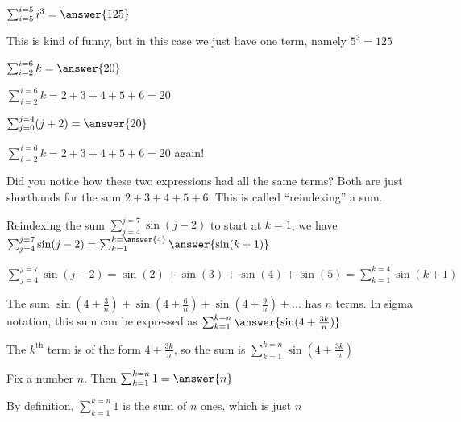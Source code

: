 \documentclass{ximera}
\begin{document}
\begin{question}
	$\sum_{i=5}^{i=5} i^3 = \answer{125}$
	\begin{hint}
		This is kind of funny, but in this case we just have one term, namely $5^3 = 125$
	\end{hint}
\end{question}

\begin{question}

	$\sum_{i=2}^{i=6} k = \answer{20}$

	 \begin{hint}
	 	$\sum_{i=2}^{i=6} k = 2+3+4+5+6 = 20$
	 \end{hint}
	
	$\sum_{j=0}^{j=4} (j+2) = \answer{20}$
	 \begin{hint}
	 	$\sum_{i=2}^{i=6} k = 2+3+4+5+6 = 20$ again!
	 \end{hint}
	
	\begin{feedback}
Did you notice how these two expressions had all the same terms?  Both are just shorthands for the sum $2+3+4+5+6$.  This is called ``reindexing'' a sum.
	\end{feedback}
\end{question}

\begin{question}
	Reindexing the sum $\sum_{j=4}^{j=7} \sin(j-2)$ to start at $k=1$, we have $\sum_{j=4}^{j=7} \sin(j-2) = \sum_{k=1}^{k=\answer{4}} \answer{\sin(k+1)}$
		\begin{hint}
			$\sum_{j=4}^{j=7} \sin(j-2) = \sin(2)+\sin(3) + \sin(4)+\sin(5) = \sum_{k=1}^{k=4} \sin(k+1)$
		\end{hint}
\end{question}

\begin{question}
	The sum $\sin(4+\frac{3}{n}) + \sin(4+\frac{6}{n})+\sin(4+\frac{9}{n})+...$ has $n$ terms. In sigma notation, this sum can be expressed as $\sum_{k=1}^{k=n} \answer{ \sin(4+\frac{3k}{n})}$
		\begin{hint}
			The $k^{\textrm{th}}$ term is of the form $4+\frac{3k}{n}$, so the sum is $\sum_{k=1}^{k=n} \sin(4+\frac{3k}{n})$
		\end{hint}
\end{question}

\begin{question}
	Fix a number $n$.  Then $\sum_{k=1}^{k=n} 1 = \answer{n}$
	 \begin{hint}
	 	By definition, $\sum_{k=1}^{k=n} 1$ is the sum of $n$ ones, which is just $n$
	 \end{hint}
\end{question}
\end{document}

